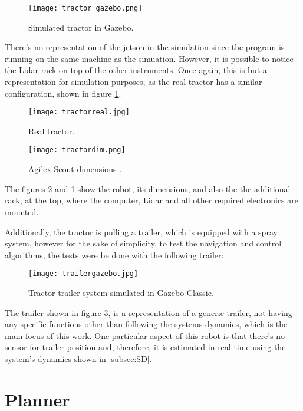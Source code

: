 \begin{figure}[h]
    \centering
    \texttt{[image: tractor\_gazebo.png]}
    \caption{Simulated tractor in Gazebo.}
\end{figure}

There's no representation of the jetson in the simulation since the program is running on 
the same machine as the simuation. However, it is possible to 
notice the Lidar rack on top of the other instruments. Once again, this is 
but a representation for simulation purposes, as the real tractor has a similar 
configuration, shown in figure \ref{fig:tractor}.
\begin{figure}[h]
    \centering
    \texttt{[image: tractorreal.jpg]}
    \caption{Real tractor.}
    \label{fig:tractor}
\end{figure}

 
\begin{figure}[h]
    \centering
    \texttt{[image: tractordim.png]}
    \caption{Agilex Scout dimensions \cite{scoutdim}.}
    \label{fig:tractordim}
\end{figure}

The figures \ref{fig:tractordim} and \ref{fig:tractor} show the robot, its dimensions, and also the 
the additional rack, at the top, where the computer, Lidar and all other required electronics 
are mounted.

Additionally, the tractor is pulling a trailer, which is equipped with 
a spray system, however for the sake of simplicity, to test the navigation 
and control algorithms, the tests were be done with the following trailer:
\clearpage
\begin{figure}[h]
    \centering
    \texttt{[image: trailergazebo.jpg]}
    \caption{Tractor-trailer system simulated in Gazebo Classic.}
    \label{fig:trailergazebo}
\end{figure}

The trailer shown in figure \ref{fig:trailergazebo}, is a representation of a generic trailer, not having any specific 
functions other than following the systems dynamics, which is the main focus of this work. 
One particular aspect of this robot is that there's no sensor for 
trailer position and, therefore, it is estimated in real time using the 
system's dynamics shown in \ref{subsec:SD}.
\section{Planner}
\label{sec:planner1}
